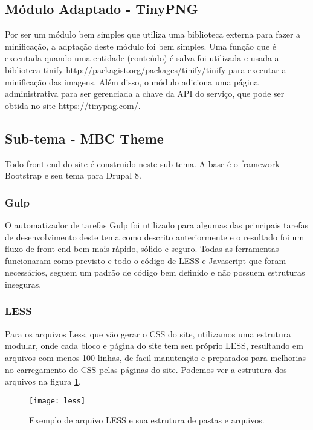 \subsection{Módulo Adaptado - TinyPNG}
Por ser um módulo bem simples que utiliza uma biblioteca externa para fazer a minificação, a adptação deste módulo foi bem simples. Uma função que é executada quando uma entidade (conteúdo) é salva foi utilizada e usada a biblioteca tinify \url{http://packagist.org/packages/tinify/tinify} para executar a minificação das imagens. Além disso, o módulo adiciona uma página administrativa para ser gerenciada a chave da API do serviço, que pode ser obtida no site \url{https://tinypng.com/}.

\subsection{Sub-tema - MBC Theme}
Todo front-end do site é construido neste sub-tema. A base é o framework Bootstrap e seu tema para Drupal 8. 

\subsubsection{Gulp}
O automatizador de tarefas Gulp foi utilizado para algumas das principais tarefas de desenvolvimento deste tema como descrito anteriormente e o resultado foi um fluxo de front-end bem mais rápido, sólido e seguro. Todas as ferramentas funcionaram como previsto e todo o código de LESS e Javascript que foram necessários, seguem um padrão de código bem definido e não possuem estruturas inseguras.

\subsubsection{LESS}
Para os arquivos Less, que vão gerar o CSS do site, utilizamos uma estrutura modular, onde cada bloco e página do site tem seu próprio LESS, resultando em arquivos com menos 100 linhas, de facil manutenção e preparados para melhorias no carregamento do CSS pelas páginas do site. Podemos ver a estrutura dos arquivos na figura \ref{less}.

\begin{figure}[ht]
  \centering
  \texttt{[image: less]}
  \caption{Exemplo de arquivo LESS e sua estrutura de pastas e arquivos.}
  \label{less}
\end{figure}

